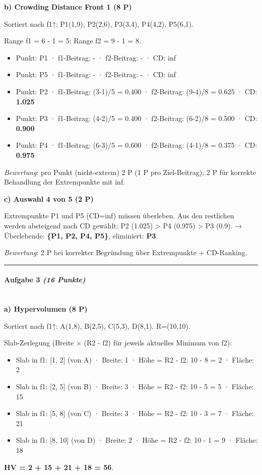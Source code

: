 \documentclass[11pt, a4paper]{article}
\begin{document}
\textbf{b) Crowding Distance Front 1 (8 P)}


Sortiert nach f1↑: P1(1,9), P2(2,6), P3(3,4), P4(4,2), P5(6,1).

Range f1 = 6 - 1 = 5; Range f2 = 9 - 1 = 8.


\begin{itemize}
  \item Punkt: P1 · f1-Beitrag: - · f2-Beitrag: - · CD: inf
  \item Punkt: P5 · f1-Beitrag: - · f2-Beitrag: - · CD: inf
  \item Punkt: P2 · f1-Beitrag: (3-1)/5 = 0.400 · f2-Beitrag: (9-4)/8 = 0.625 · CD: \textbf{1.025}
  \item Punkt: P3 · f1-Beitrag: (4-2)/5 = 0.400 · f2-Beitrag: (6-2)/8 = 0.500 · CD: \textbf{0.900}
  \item Punkt: P4 · f1-Beitrag: (6-3)/5 = 0.600 · f2-Beitrag: (4-1)/8 = 0.375 · CD: \textbf{0.975}
\end{itemize}
\textit{Bewertung}: pro Punkt (nicht-extrem) 2 P (1 P pro Ziel-Beitrag); 2 P für korrekte Behandlung der Extrempunkte mit inf.


\textbf{c) Auswahl 4 von 5 (2 P)}


Extrempunkte P1 und P5 (CD=inf) müssen überleben. Aus den restlichen werden absteigend nach CD gewählt: P2 (1.025) > P4 (0.975) > P3 (0.9). → Überlebende: \textbf{\{P1, P2, P4, P5\}}, eliminiert: \textbf{P3}.


\textit{Bewertung}: 2 P bei korrekter Begründung über Extrempunkte + CD-Ranking.



\noindent\textcolor{rulegray}{\rule{\linewidth}{0.4pt}}


\paragraph{Aufgabe 3 \textit{(16 Punkte)}}\mbox{}\\[2pt]

\textbf{a) Hypervolumen (8 P)}


Sortiert nach f1↑: A(1,8), B(2,5), C(5,3), D(8,1). R=(10,10).


Slab-Zerlegung (Breite × (R2 - f2) für jeweils aktuelles Minimum von f2):


\begin{itemize}
  \item Slab in f1: [1, 2] (von A) · Breite: 1 · Höhe = R2 - f2: 10 - 8 = 2 · Fläche: 2
  \item Slab in f1: [2, 5] (von B) · Breite: 3 · Höhe = R2 - f2: 10 - 5 = 5 · Fläche: 15
  \item Slab in f1: [5, 8] (von C) · Breite: 3 · Höhe = R2 - f2: 10 - 3 = 7 · Fläche: 21
  \item Slab in f1: [8, 10] (von D) · Breite: 2 · Höhe = R2 - f2: 10 - 1 = 9 · Fläche: 18
\end{itemize}
\textbf{HV = 2 + 15 + 21 + 18 = 56}.
\end{document}
